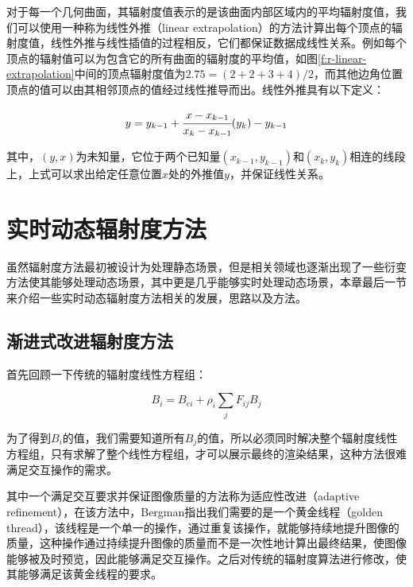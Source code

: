 对于每一个几何曲面，其辐射度值表示的是该曲面内部区域内的平均辐射度值，我们可以使用一种称为线性外推（linear extrapolation）的方法计算出每个顶点的辐射度值，线性外推与线性插值的过程相反，它们都保证数据成线性关系。例如每个顶点的辐射值可以为包含它的所有曲面的辐射度的平均值，如图\ref{f:r-linear-extrapolation}中间的顶点辐射度值为$2.75=(2+2+3+4)/2$，而其他边角位置顶点的值可以由其相邻顶点的值经过线性推导而出。线性外推具有以下定义：

\begin{equation}
	y=y_{k-1}+ \cfrac{x-x_{k-1}}{x_k-x_{k-1}}(y_k)-y_{k-1}
\end{equation}

\noindent 其中，$(y,x)$为未知量，它位于两个已知量$(x_{k-1},y_{k-1})$和$(x_k,y_k)$相连的线段上，上式可以求出给定任意位置$x$处的外推值$y$，并保证线性关系。






\section{实时动态辐射度方法}\label{sec:r-dynamic-radiosity}
虽然辐射度方法最初被设计为处理静态场景，但是相关领域也逐渐出现了一些衍变方法使其能够处理动态场景，其中\cite{a:Real-TimeDynamicRadiosityforHighQualityGlobalIllumination}更是几乎能够实时处理动态场景，本章最后一节来介绍一些实时动态辐射度方法相关的发展，思路以及方法。




\subsection{渐进式改进辐射度方法}\label{sec:r-progressive refinement-adiosity}
首先回顾一下传统的辐射度线性方程组：

\begin{equation}\label{e:r-gathering}
	B_i=B_{ei}+\rho_i \sum_j F_{ij} B_j
\end{equation}

为了得到$B_i$的值，我们需要知道所有$B_j$的值，所以必须同时解决整个辐射度线性方程组，只有求解了整个线性方程组，才可以展示最终的渲染结果，这种方法很难满足交互操作的需求。

其中一个满足交互要求并保证图像质量的方法称为适应性改进（adaptive refinement）\cite{a:ImageRenderingbyAdaptiveRefinement}，在该方法中，Bergman指出我们需要的是一个黄金线程（golden thread），该线程是一个单一的操作，通过重复该操作，就能够持续地提升图像的质量，这种操作通过持续提升图像的质量而不是一次性地计算出最终结果，使图像能够被及时预览，因此能够满足交互操作。之后\cite{a:AProgressiveRefinementApproachtoFastRadiosityImageGeneration}对传统的辐射度算法进行修改，使其能够满足该黄金线程的要求。

